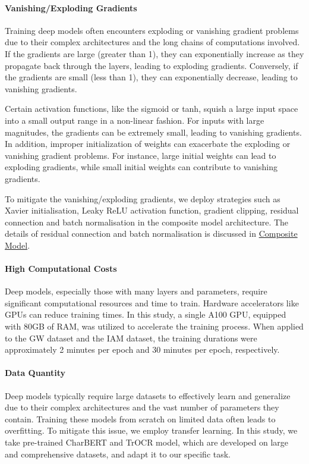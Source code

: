 \paragraph*{Vanishing/Exploding Gradients}
\label{par:4_vanishing_exploding_gradients}
Training deep models often encounters exploding or vanishing gradient problems due to their complex architectures and the long chains of computations involved. If the gradients are large (greater than 1), they can exponentially increase as they propagate back through the layers, leading to exploding gradients. Conversely, if the gradients are small (less than 1), they can exponentially decrease, leading to vanishing gradients. 

Certain activation functions, like the sigmoid or tanh, squish a large input space into a small output range in a non-linear fashion. For inputs with large magnitudes, the gradients can be extremely small, leading to vanishing gradients. In addition, improper initialization of weights can exacerbate the exploding or vanishing gradient problems. For instance, large initial weights can lead to exploding gradients, while small initial weights can contribute to vanishing gradients.

To mitigate the vanishing/exploding gradients, we deploy strategies such as Xavier initialisation, Leaky ReLU activation function, gradient clipping, residual connection and batch normalisation in the composite model architecture. The details of residual connection and batch normalisation is discussed in \hyperref[subsec:3_composite_model]{Composite Model}.

\paragraph*{High Computational Costs}
\label{par:4_high_computational_costs}
Deep models, especially those with many layers and parameters, require significant computational resources and time to train. Hardware accelerators like GPUs can reduce training times. In this study, a single A100 GPU, equipped with 80GB of RAM, was utilized to accelerate the training process. When applied to the GW dataset and the IAM dataset, the training durations were approximately 2 minutes per epoch and 30 minutes per epoch, respectively.

\paragraph*{Data Quantity}
\label{par:4_data_quantity}
Deep models typically require large datasets to effectively learn and generalize due to their complex architectures and the vast number of parameters they contain. Training these models from scratch on limited data often leads to overfitting. To mitigate this issue, we employ transfer learning. In this study, we take pre-trained CharBERT and TrOCR model, which are developed on large and comprehensive datasets, and adapt it to our specific task. 

